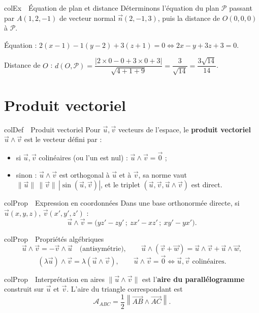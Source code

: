 \documentclass[11pt,a4paper]{article}
\newenvironment{definition}[1][Définition]
  {\begin{fiche}{colDef}{\ding{110}~~#1}}{\end{fiche}}
\newenvironment{propriete}[1][Propriété]
  {\begin{fiche}{colProp}{\ding{72}~~#1}}{\end{fiche}}
\newenvironment{exemple}[1][Exemple]
  {\begin{fiche}{colEx}{\ding{217}~~#1}}{\end{fiche}}
\begin{document}
\begin{exemple}[Équation de plan et distance]
Déterminons l'équation du plan $\mathcal{P}$ passant par $A(1,2,-1)$ de vecteur normal $\vec n(2,-1,3)$, puis la distance de $O(0,0,0)$ à $\mathcal{P}$.

\smallskip
Équation : $2(x-1)-1(y-2)+3(z+1)=0 \iff 2x-y+3z+3=0$.

\smallskip
Distance de $O$ : $d(O,\mathcal{P})=\dfrac{|2\times0-0+3\times0+3|}{\sqrt{4+1+9}}=\dfrac{3}{\sqrt{14}}=\dfrac{3\sqrt{14}}{14}$.
\end{exemple}

\section{Produit vectoriel}

\begin{definition}[Produit vectoriel]
Pour $\vec u,\vec v$ vecteurs de l'espace, le \textbf{produit vectoriel} $\vec u\wedge\vec v$ est le vecteur défini par :
\begin{itemize}[leftmargin=6mm, itemsep=0.5mm]
  \item si $\vec u,\vec v$ colinéaires (ou l'un est nul) : $\vec u\wedge\vec v=\vec0$ ;
  \item sinon : $\vec u\wedge\vec v$ est orthogonal à $\vec u$ et à $\vec v$, sa norme vaut $\|\vec u\|\,\|\vec v\|\,|\sin(\vec u,\vec v)|$, et le triplet $(\vec u,\vec v,\vec u\wedge\vec v)$ est direct.
\end{itemize}
\end{definition}

\begin{propriete}[Expression en coordonnées]
Dans une base orthonormée directe, si $\vec u(x,y,z)$, $\vec v(x',y',z')$ :
\[
  \vec u\wedge\vec v = \bigl(yz'-zy'\,;\ zx'-xz'\,;\ xy'-yx'\bigr).
\]
\end{propriete}

\begin{propriete}[Propriétés algébriques]
\[
  \vec u\wedge\vec v = -\vec v\wedge\vec u \quad\text{(antisymétrie)}, \qquad
  \vec u\wedge(\vec v+\vec w) = \vec u\wedge\vec v+\vec u\wedge\vec w,
\]
\[
  (\lambda\vec u)\wedge\vec v = \lambda(\vec u\wedge\vec v), \qquad
  \vec u\wedge\vec v = \vec0 \iff \vec u,\vec v \text{ colinéaires}.
\]
\end{propriete}

\begin{propriete}[Interprétation en aires]
$\|\vec u\wedge\vec v\|$ est l'\textbf{aire du parallélogramme} construit sur $\vec u$ et $\vec v$. L'aire du triangle correspondant est
\[
  \mathcal{A}_{ABC} = \frac12\left\|\overrightarrow{AB}\wedge\overrightarrow{AC}\right\|.
\]
\end{propriete}
\end{document}

